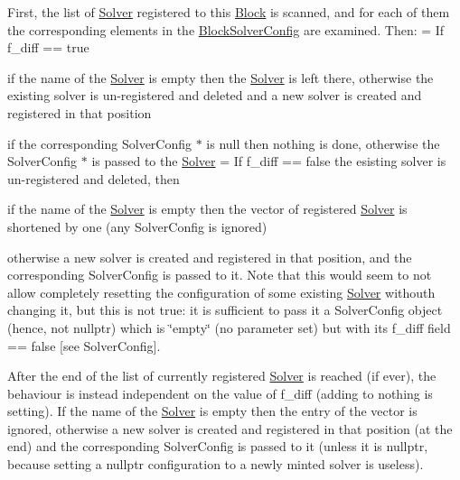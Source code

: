 \begin{DoxyItemize}
\item First, the list of \mbox{\hyperlink{class_s_m_spp__di__unipi__it_1_1_solver}{Solver}} registered to this \mbox{\hyperlink{class_s_m_spp__di__unipi__it_1_1_block}{Block}} is scanned, and for each of them the corresponding elements in the \mbox{\hyperlink{class_s_m_spp__di__unipi__it_1_1_block_solver_config}{Block\+Solver\+Config}} are examined. Then\+: = If f\+\_\+diff == true
\begin{DoxyItemize}
\item if the name of the \mbox{\hyperlink{class_s_m_spp__di__unipi__it_1_1_solver}{Solver}} is empty then the \mbox{\hyperlink{class_s_m_spp__di__unipi__it_1_1_solver}{Solver}} is left there, otherwise the existing solver is un-\/registered and deleted and a new solver is created and registered in that position
\item if the corresponding Solver\+Config $\ast$ is null then nothing is done, otherwise the Solver\+Config $\ast$ is passed to the \mbox{\hyperlink{class_s_m_spp__di__unipi__it_1_1_solver}{Solver}} = If f\+\_\+diff == false the esisting solver is un-\/registered and deleted, then
\item if the name of the \mbox{\hyperlink{class_s_m_spp__di__unipi__it_1_1_solver}{Solver}} is empty then the vector of registered \mbox{\hyperlink{class_s_m_spp__di__unipi__it_1_1_solver}{Solver}} is shortened by one (any Solver\+Config is ignored)
\item otherwise a new solver is created and registered in that position, and the corresponding Solver\+Config is passed to it. Note that this would seem to not allow completely resetting the configuration of some existing \mbox{\hyperlink{class_s_m_spp__di__unipi__it_1_1_solver}{Solver}} withouth changing it, but this is not true\+: it is sufficient to pass it a Solver\+Config object (hence, not nullptr) which is \char`\"{}empty\char`\"{} (no parameter set) but with its f\+\_\+diff field == false \mbox{[}see Solver\+Config\mbox{]}.
\end{DoxyItemize}
\item After the end of the list of currently registered \mbox{\hyperlink{class_s_m_spp__di__unipi__it_1_1_solver}{Solver}} is reached (if ever), the behaviour is instead independent on the value of f\+\_\+diff (adding to nothing is setting). If the name of the \mbox{\hyperlink{class_s_m_spp__di__unipi__it_1_1_solver}{Solver}} is empty then the entry of the vector is ignored, otherwise a new solver is created and registered in that position (at the end) and the corresponding Solver\+Config is passed to it (unless it is nullptr, because setting a nullptr configuration to a newly minted solver is useless).
\end{DoxyItemize}

